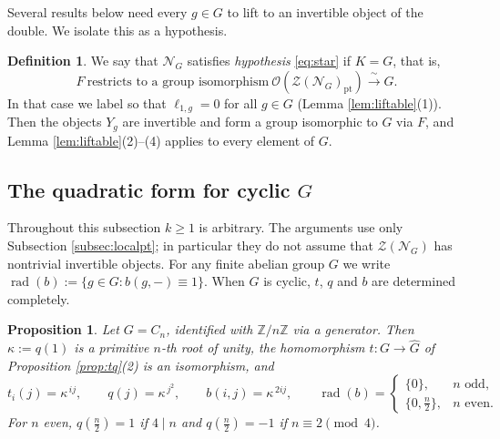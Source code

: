 \documentclass[10pt]{article}
\theoremstyle{plain}
\newtheorem{proposition}[theorem]{Proposition}
\theoremstyle{definition}
\newtheorem{definition}[theorem]{Definition}
\theoremstyle{plain}
\begin{document}
Several results below need every $g\in G$ to lift to an invertible object of the double. We isolate this as a hypothesis.

\begin{definition}\label{hyp:H}
We say that $\mathcal{N}_G$ satisfies \emph{hypothesis} \eqref{eq:star} if $K=G$, that is,
\begin{equation}\label{eq:star}\tag{H}
  F\ \text{restricts to a group isomorphism}\
  \mathcal{O}(\mathcal{Z}(\mathcal{N}_G)_\mathrm{pt})\xrightarrow{\ \sim\ }G .
\end{equation}
In that case we label so that $\ell_{1,g}=0$ for all $g\in G$ (Lemma \ref{lem:liftable}(1)). Then the objects $Y_g$ are invertible and form a group isomorphic to $G$ via $F$, and Lemma \ref{lem:liftable}(2)--(4) applies to every element of $G$.
\end{definition}


\subsection{The quadratic form for cyclic \texorpdfstring{$G$}{G}}\label{subsec:prim}

Throughout this subsection $k\geq1$ is arbitrary. The arguments use only Subsection \ref{subsec:localpt}; in particular they do not assume that $\mathcal{Z}(\mathcal{N}_G)$ has nontrivial invertible objects. For any finite abelian group $G$ we write $\operatorname{rad}(b):=\{g\in G:b(g,-)\equiv1\}$. When $G$ is cyclic, $t$, $q$ and $b$ are determined completely.

\begin{proposition}\label{cor:cyclic}
Let $G=C_n$, identified with $\mathbb{Z}/n\mathbb{Z}$ via a generator. Then $\kappa:=q(1)$ is a primitive $n$-th root of unity, the homomorphism $t\colon G\to\widehat{G}$ of Proposition \ref{prop:tq}(2) is an isomorphism, and
\begin{equation}\label{eq:qbcyclic}
  t_i(j)=\kappa^{\,ij},\qquad q(j)=\kappa^{\,j^{2}},\qquad b(i,j)=\kappa^{\,2ij},\qquad
  \operatorname{rad}(b)=\begin{cases}\{0\}, & n \text{ odd},\\ \{0,\tfrac n2\}, & n\text{ even}.\end{cases}
\end{equation}
For $n$ even, $q(\tfrac n2)=1$ if $4\mid n$ and $q(\tfrac n2)=-1$ if
$n\equiv2\pmod4$.
\end{proposition}
 
\end{document}
